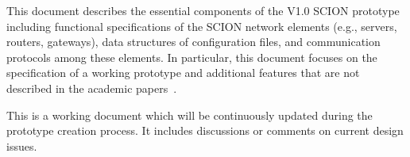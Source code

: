 
This document describes the essential components of the V1.0 SCION
prototype including functional specifications of the SCION network
elements (e.g., servers, routers, gateways), data structures of
configuration files, and communication protocols among these
elements. In particular, this document focuses on the specification
of a working prototype and additional features that are not described
in the academic papers~\cite{ZHHCPA2011}.

This is a working document which will be continuously updated during
the prototype creation process. It includes discussions or comments
on current design issues.


